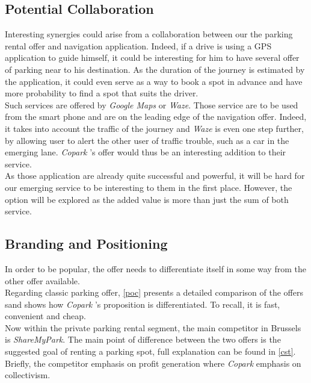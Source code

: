 \documentclass[12pt,a4paper,oneside]{book}
\newcommand{\bp}{\textit{Copark }}
\begin{document}
\subsection{Potential Collaboration}
Interesting synergies could arise from a collaboration between our the parking rental offer and navigation application. Indeed, if a drive is using a GPS application to guide himself, it could be interesting for him to have several offer of parking near to his destination. As the duration of the journey is estimated by the application, it could even serve as a way to book a spot in advance and have more probability to find a spot that suits the driver.\\
Such services are offered by \textit{Google Maps} or \textit{Waze}. Those service are to be used from the smart phone and are on the leading edge of the navigation offer. Indeed, it takes into account the traffic of the journey and \textit{Waze} is even one step further, by allowing user to alert the other user of traffic trouble, such as a car in the emerging lane. \bp's offer would thus be an interesting addition to their service.\\
As those application are already quite successful and powerful, it will be hard for our emerging service to be interesting to them in the first place. However, the option will be explored as the added value is more than just the sum of both service.

\subsection{Branding and Positioning}

In order to be popular, the offer needs to differentiate itself in some way from the other offer available.\\

Regarding classic parking offer, \autoref{poc} presents a detailed comparison of the offers sand shows how \bp's proposition is differentiated. To recall, it is fast, convenient and cheap.\\

Now within the private parking rental segment, the main competitor in Brussels is \textit{ShareMyPark}. The main point of difference between the two offers is the suggested goal of renting a parking spot, full explanation can be found in \autoref{cst}. Briefly, the competitor emphasis on profit generation where \bp emphasis on collectivism.\\
\end{document}
